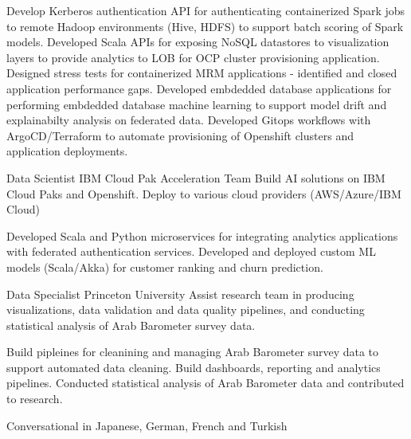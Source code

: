 \documentclass[a4paper]{Resume}
\begin{document}
{Develop Kerberos authentication API for authenticating containerized Spark jobs to remote Hadoop environments (Hive, HDFS) to support batch scoring of Spark models.}
{Developed Scala APIs for exposing NoSQL datastores to visualization layers to provide analytics to LOB for OCP cluster provisioning application.}
{Designed stress tests for containerized MRM applications - identified and closed application performance gaps.}
{Developed embdedded database applications for performing embdedded database machine learning to support model drift and explainabilty analysis on federated data.}
{Developed Gitops workflows with ArgoCD/Terraform to automate provisioning of Openshift clusters and application deployments.}


{Data Scientist}
{IBM Cloud Pak Acceleration Team}
{Build AI solutions on IBM Cloud Paks and Openshift. Deploy to various cloud providers (AWS/Azure/IBM Cloud)}

{Developed Scala and Python microservices for integrating analytics applications with federated authentication services.}
{Developed and deployed custom ML models (Scala/Akka) for customer ranking and churn prediction.}


{Data Specialist}
{Princeton University}
{Assist research team in producing visualizations, data validation and data quality pipelines, and conducting statistical analysis of Arab Barometer survey data.}

{Build pipleines for cleanining and managing Arab Barometer survey data to support automated data cleaning.}
{Build dashboards, reporting and analytics pipelines. Conducted statistical analysis of Arab Barometer data and contributed to research.}




         

		  {Conversational  in Japanese,}
		  {German,}
		  {French and}
		  {Turkish}
          
\clearpage


 
\end{document}
